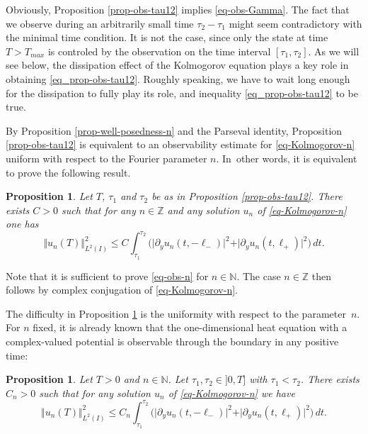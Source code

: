 \documentclass[10pt]{amsart}
\theoremstyle{plain}
\newtheorem{proposition}[theorem]{Proposition}
\theoremstyle{definition}
\newcommand{\abs}[1]{\vert #1\vert}
\newcommand{\nr}[1]{\Vert #1\Vert}
\newcommand{\1}{\mathds 1}
\newcommand{\N}{\mathbb{N}}
\newcommand{\Z}{\mathbb{Z}}
\begin{document}
Obviously, Proposition \ref{prop-obs-tau12} implies \eqref{eq-obs-Gamma}. The fact that we observe during an arbitrarily small time $\tau_2 - \tau_1$ might seem contradictory with the minimal time condition. It is not the case, since only the state at time $T>T_{max}$ is controled by the observation on the
time interval $[\tau_1,\tau_2]$. As we will see below, the dissipation effect of the Kolmogorov equation plays a key role in obtaining \eqref{eq_prop-obs-tau12}. Roughly speaking, we have to wait long enough for the dissipation to fully play its role, and
inequality \eqref{eq_prop-obs-tau12} to be true.

By Proposition \ref{prop-well-posedness-n} and the Parseval identity, Proposition \ref{prop-obs-tau12} is equivalent to an observability estimate for \eqref{eq-Kolmogorov-n} uniform with respect to the Fourier parameter $n$. In~other words, it is equivalent to prove the following result.

\begin{proposition} \label{prop-observability-n}
Let $T$, $\tau_1$ and $\tau_2$ be as in Proposition \ref{prop-obs-tau12}. There exists $C>0$ such that for any $n \in \mathbb{Z}$ and any solution $u_n$ of \eqref{eq-Kolmogorov-n} one has
\begin{equation} \label{eq-obs-n}
\Vert u_n(T) \Vert_{L^2(I)}^2 \leq C \int_{\tau_1}^{\tau_2} \bigl(\vert \partial_y u_n(t,-\ell_-)\vert^2 + \vert \partial_y u_n(t,\ell_+) \vert^2 \bigr) \, dt.
\end{equation}
\end{proposition}

Note that it is sufficient to prove \eqref{eq-obs-n} for $n \in \N$. The case $n \in \Z$ then follows by complex conjugation of \eqref{eq-Kolmogorov-n}.

The difficulty in Proposition \ref{prop-observability-n} is the uniformity with respect to the parameter~$n$. For $n$ fixed, it is already known that the one-dimensional heat equation with a complex-valued potential is observable through the boundary in any positive time:

\begin{proposition} \label{prop-obs-fix-n}
Let $T>0$ and $n \in \mathbb{N}$. Let $\tau_1,\tau_2 \in{}]0,T]$ with $\tau_1 < \tau_2$. There exists $C_n > 0$ such that for any solution $u_n$ of \eqref{eq-Kolmogorov-n} we have
\begin{equation} \label{equ_obsineq_fixedn}
\nr{u_n(T)}_{L^2(I)}^2 \leq C_n \int_{\tau_1}^{\tau_2} \bigl(\abs {\partial_y u_n(t,-\ell_-)}^2 + \abs{\partial_y u_n(t,\ell_+)}^2 \bigr) \, dt.
\end{equation}
\end{proposition}
\end{document}
